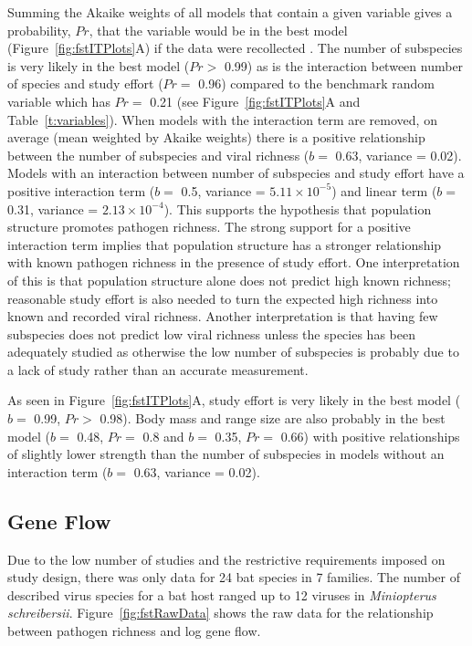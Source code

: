 Summing the Akaike weights of all models that contain a given variable gives a probability, $Pr$, that the variable would be in the best model (Figure~\ref{fig:fstITPlots}A) if the data were recollected \cite{whittingham2006we}.
The number of subspecies is very likely in the best model ($Pr > $ 0.99) as is the interaction between number of species and study effort ($Pr = $ 0.96) compared to the benchmark random variable which has $Pr = $ 0.21 (see Figure~\ref{fig:fstITPlots}A and Table~\ref{t:variables}).
When models with the interaction term are removed, on average (mean weighted by Akaike weights) there is a positive relationship between the number of subspecies and viral richness ($b = $ 0.63, variance = 0.02).
Models with an interaction between number of subspecies and study effort have a positive interaction term ($b = $ 0.5, variance = \ensuremath{5.11\times 10^{-5}}) and linear term ($b = $ 0.31, variance = \ensuremath{2.13\times 10^{-4}}).
This supports the hypothesis that population structure promotes pathogen richness.
The strong support for a positive interaction term implies that population structure has a stronger relationship with known pathogen richness in the presence of study effort.
One interpretation of this is that population structure alone does not predict high known richness; reasonable study effort is also needed to turn the expected high richness into known and recorded viral richness.
Another interpretation is that having few subspecies does not predict low viral richness unless the species has been adequately studied as otherwise the low number of subspecies is probably due to a lack of study rather than an accurate measurement.


As seen in Figure~\ref{fig:fstITPlots}A, study effort is very likely in the best model ($b = $ 0.99, $Pr > $ 0.98).
Body mass and range size are also probably in the best model ($b = $ 0.48, $Pr = $ 0.8 and $b = $ 0.35, $Pr = $ 0.66) with positive relationships of slightly lower strength than the number of subspecies in models without an interaction term ($b = $ 0.63, variance = 0.02).	



\subsection{Gene Flow}

Due to the low number of studies and the restrictive requirements imposed on study design, there was only data for 24 bat species in 7 families.
The number of described virus species for a bat host ranged up to 12 viruses in \emph{Miniopterus schreibersii}.
Figure~\ref{fig:fstRawData} shows the raw data for the relationship between pathogen richness and log gene flow.


